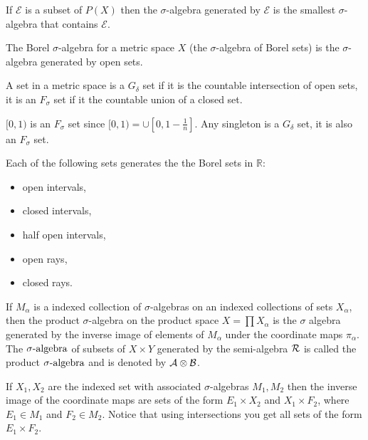 \begin{dfn} If $\mathcal{E}$ is a subset of $P(X)$ then the $\sigma$-algebra generated by $\mathcal{E}$ is the smallest $\sigma$-algebra that contains $\mathcal{E}$.
\end{dfn}

\begin{dfn} The Borel $\sigma$-algebra for a metric space $X$ (the $\sigma$-algebra of Borel sets) is the $\sigma$-algebra generated by open sets.
\end{dfn}

\begin{dfn} A set in a metric space is a $G_{\delta}$ set if it is the countable intersection of open sets, it is an $F_{\sigma}$ set if it the countable union of a closed set.
\end{dfn}

\begin{example} $[0,1)$ is an $F_{\sigma}$ set since $ [0,1) = \cup [0, 1- \frac{1}{n}]$.  Any singleton is a $G_{\delta}$ set, it is also an $F_{\sigma}$ set.
\end{example}

\begin{prop} Each of the following sets generates the the Borel sets in $ \mathbb{R}$:
\begin{itemize}
\item open intervals,
\item closed intervals,
\item half open intervals,
\item open rays,
\item closed rays.
\end{itemize} 
\end{prop}

\begin{dfn}[product $\sa$] If $M_{\alpha}$ is a indexed collection of $\sigma$-algebras on an indexed collections of sets $X_{\alpha}$, then the product $\sigma$-algebra on the product space $X = \prod X_{\alpha}$ is the $\sigma$ algebra generated by the inverse image of elements of $M_{\alpha}$ under the coordinate maps $\pi_{\alpha}$.\\
The $\sa$ of subsets of $X \times Y$ generated by the semi-algebra ${\mathcal R}$ is called the product $\sa$ and is denoted by ${\mathcal A} \otimes {\mathcal B}$.
\end{dfn}

\begin{example}
If $X_1, X_2$ are the indexed set with associated $\sigma$-algebras $M_1, M_2$ then the inverse image of the coordinate maps are sets of the form $ E_1\times X_2$ and $X_1 \times F_2$, where $E_1 \in M_1$ and $F_2 \in M_2$.  Notice that using intersections you get all sets of the form $E_1 \times F_2$.
\end{example}


